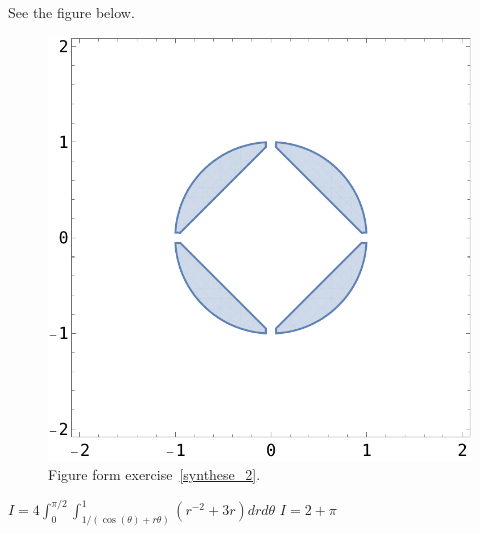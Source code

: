 \begin{Answer}

\Question See the figure below. 
\begin{figure}[H]
    \centerline{
   \includegraphics[scale=0.5]{fig_synthese_2}
    }
    \caption{Figure form exercise~\ref{synthese_2}.}
    \end{figure}
\Question $\displaystyle I = 4\int_0^{\pi/2} \int_{1/(\cos(\theta)+r\theta)}^1 \left(r^{-2} +3r\right) dr d\theta$
\Question $I=2+\pi$
    
\end{Answer}




